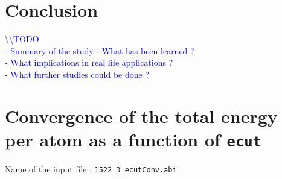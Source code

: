 \documentclass[11pt,a4paper]{article}
\begin{document}
\section{Conclusion}
\textcolor{blue}{
\textbackslash\textbackslash TODO\\
- Summary of the study
- What has been learned ? \\
- What implications in real life applications ?\\
- What further studies could be done ?}


\newpage
\appendix
\section{Convergence of the total energy per atom as a function of \texttt{ecut}}
\label{Abi1}
Name of the input file : \texttt{1522\_3\_ecutConv.abi}
\end{document}
